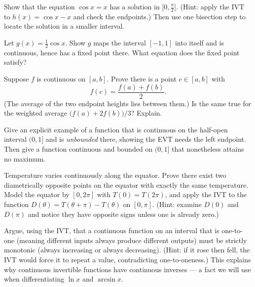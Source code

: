 \begin{exercise}
\label{ch08:exr-root}
Show that the equation $\cos x = x$ has a solution in $\big[0,\tfrac{\pi}{2}\big]$. (Hint:
apply the IVT to $h(x)=\cos x - x$ and check the endpoints.) Then use one bisection step to
locate the solution in a smaller interval.
\end{exercise}

\begin{exercise}
\label{ch08:exr-fixed}
Let $g(x)=\tfrac12\cos x$. Show $g$ maps the interval $[-1,1]$ into itself and is
continuous, hence has a fixed point there. What equation does the fixed point satisfy?
\end{exercise}

\begin{exercise}
\label{ch08:exr-avg}
Suppose $f$ is continuous on $[a,b]$. Prove there is a point $c\in[a,b]$ with
\[
  f(c)=\frac{f(a)+f(b)}{2}.
\]
(The average of the two endpoint heights lies between them.) Is the same true for
the weighted average $\bigl(f(a)+2f(b)\bigr)/3$? Explain.
\end{exercise}

\begin{exercise}
\label{ch08:exr-hyp}
Give an explicit example of a function that is continuous on the half-open interval
$(0,1]$ and is \emph{unbounded} there, showing the EVT needs the left endpoint.
Then give a function continuous and bounded on $(0,1]$ that nonetheless attains no maximum.
\end{exercise}

\begin{exercise}
\label{ch08:exr-antipodal}
Temperature varies continuously along the equator. Prove there exist two diametrically
opposite points on the equator with exactly the same temperature. Model the equator by
$[0,2\pi]$ with $T(0)=T(2\pi)$, and apply the IVT to the function
$D(\theta)=T(\theta+\pi)-T(\theta)$ on $[0,\pi]$. (Hint: examine $D(0)$ and $D(\pi)$ and
notice they have opposite signs unless one is already zero.)
\end{exercise}

\begin{exercise}
\label{ch08:exr-monotone}
Argue, using the IVT, that a continuous function on an interval that is one-to-one (meaning
different inputs always produce different outputs) must be strictly monotonic (always
increasing or always decreasing). (Hint: if it rose then fell, the IVT would force it to
repeat a value, contradicting one-to-oneness.) This explains why continuous invertible
functions have continuous inverses --- a fact we will use when differentiating
$\ln x$ and $\arcsin x$.
\end{exercise}


